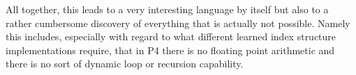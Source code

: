 All together, this leads to a very interesting language by itself but also to a rather cumbersome discovery of everything that is actually not possible. Namely this includes, especially with regard to what different learned index structure implementations require, that in P4 there is no floating point arithmetic and there is no sort of dynamic loop or recursion capability.
